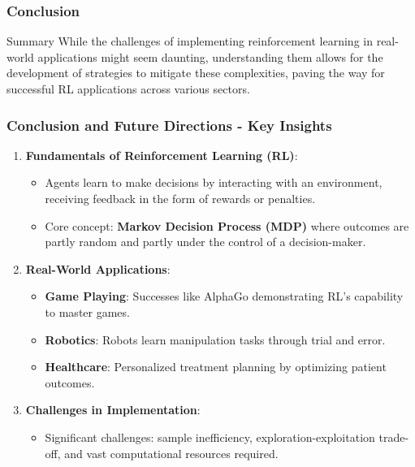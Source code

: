 \documentclass{beamer}
\begin{document}
\begin{frame}[fragile]
    \frametitle{Conclusion}
    \begin{block}{Summary}
        While the challenges of implementing reinforcement learning in real-world applications might seem daunting, understanding them allows for the development of strategies to mitigate these complexities, paving the way for successful RL applications across various sectors.
    \end{block}
\end{frame}

\begin{frame}[fragile]
    \frametitle{Conclusion and Future Directions - Key Insights}
    \begin{enumerate}
        \item \textbf{Fundamentals of Reinforcement Learning (RL)}:
        \begin{itemize}
            \item Agents learn to make decisions by interacting with an environment, receiving feedback in the form of rewards or penalties.
            \item Core concept: \textbf{Markov Decision Process (MDP)} where outcomes are partly random and partly under the control of a decision-maker.
        \end{itemize}

        \item \textbf{Real-World Applications}:
        \begin{itemize}
            \item \textbf{Game Playing}: Successes like AlphaGo demonstrating RL's capability to master games.
            \item \textbf{Robotics}: Robots learn manipulation tasks through trial and error.
            \item \textbf{Healthcare}: Personalized treatment planning by optimizing patient outcomes.
        \end{itemize}

        \item \textbf{Challenges in Implementation}:
        \begin{itemize}
            \item Significant challenges: sample inefficiency, exploration-exploitation trade-off, and vast computational resources required.
        \end{itemize}
    \end{enumerate}
\end{frame}
\end{document}
